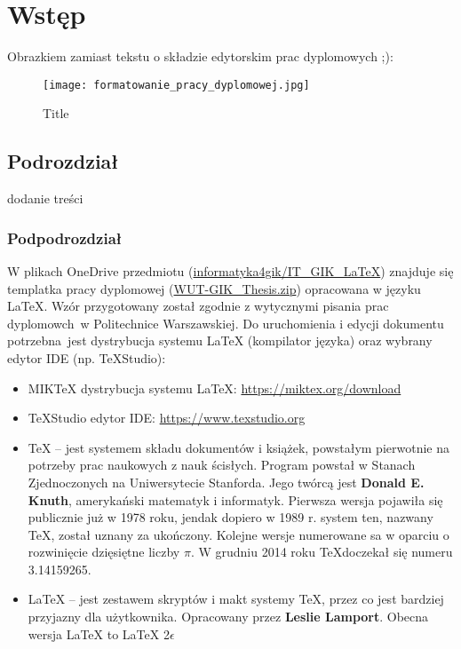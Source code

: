 \newpage %
\section{Wstęp}

Obrazkiem zamiast tekstu o składzie edytorskim prac dyplomowych ;):
\cite{Wezka2021}



\begin{figure}[!ht]
	\centering \texttt{[image: formatowanie\_pracy\_dyplomowej.jpg]}
	\caption{Title}\label{fig:1}
\end{figure}

\subsection{Podrozdział}
dodanie treści
\subsubsection{Podpodrozdział}
W plikach OneDrive przedmiotu  (\url{informatyka4gik/IT_GIK_LaTeX}) znajduje się templatka pracy dyplomowej (\url{WUT-GIK_Thesis.zip}) opracowana w języku LaTeX. 
Wzór przygotowany został zgodnie z wytycznymi pisania prac dyplomowch w Politechnice Warszawskiej.
Do uruchomienia i edycji dokumentu potrzebna jest dystrybucja systemu LaTeX (kompilator języka) oraz wybrany edytor IDE (np. TeXStudio): 
\begin{itemize}
    \item MIK\TeX{} dystrybucja systemu LaTeX: \url{https://miktex.org/download}
    \item \TeX Studio edytor IDE: \url{https://www.texstudio.org}
\end{itemize}

\begin{itemize}
    \item \TeX{} -- jest systemem składu dokumentów i książek, powstałym pierwotnie na potrzeby prac naukowych z nauk ścisłych. Program powstał w Stanach Zjednoczonych na Uniwersytecie Stanforda. Jego twórcą jest \textbf{Donald E. Knuth}, amerykański matematyk i informatyk.
    Pierwsza wersja pojawiła się publicznie już w 1978 roku, jendak dopiero w 1989 r. system ten, nazwany \TeX, został uznany za ukończony.
    Kolejne wersje numerowane sa w oparciu o rozwinięcie dzięsiętne liczby $\pi$. W grudniu 2014 roku \TeX doczekał się numeru 3.14159265.
    \item \LaTeX{} -- jest zestawem skryptów i makt systemy \TeX{}, przez co jest bardziej przyjazny dla użytkownika. Opracowany przez \textbf{Leslie Lamport}. Obecna wersja \LaTeX{} to \LaTeX{} 2$\epsilon$
\end{itemize}


